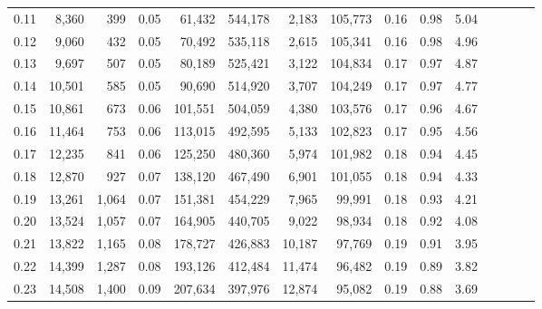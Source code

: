 \begin{tabular}{rrrcrrrrrrrrrrr}
0.11 &   8,360 &    399 &                                       0.05 &   61,432 &  544,178 &    2,183 &  105,773 &  0.16 &  0.98 &                         5.04 \\
0.12 &   9,060 &    432 &                                       0.05 &   70,492 &  535,118 &    2,615 &  105,341 &  0.16 &  0.98 &                         4.96 \\
0.13 &   9,697 &    507 &                                       0.05 &   80,189 &  525,421 &    3,122 &  104,834 &  0.17 &  0.97 &                         4.87 \\
0.14 &  10,501 &    585 &                                       0.05 &   90,690 &  514,920 &    3,707 &  104,249 &  0.17 &  0.97 &                         4.77 \\
0.15 &  10,861 &    673 &                                       0.06 &  101,551 &  504,059 &    4,380 &  103,576 &  0.17 &  0.96 &                         4.67 \\
0.16 &  11,464 &    753 &                                       0.06 &  113,015 &  492,595 &    5,133 &  102,823 &  0.17 &  0.95 &                         4.56 \\
0.17 &  12,235 &    841 &                                       0.06 &  125,250 &  480,360 &    5,974 &  101,982 &  0.18 &  0.94 &                         4.45 \\
0.18 &  12,870 &    927 &                                       0.07 &  138,120 &  467,490 &    6,901 &  101,055 &  0.18 &  0.94 &                         4.33 \\
0.19 &  13,261 &  1,064 &                                       0.07 &  151,381 &  454,229 &    7,965 &   99,991 &  0.18 &  0.93 &                         4.21 \\
0.20 &  13,524 &  1,057 &                                       0.07 &  164,905 &  440,705 &    9,022 &   98,934 &  0.18 &  0.92 &                         4.08 \\
0.21 &  13,822 &  1,165 &                                       0.08 &  178,727 &  426,883 &   10,187 &   97,769 &  0.19 &  0.91 &                         3.95 \\
0.22 &  14,399 &  1,287 &                                       0.08 &  193,126 &  412,484 &   11,474 &   96,482 &  0.19 &  0.89 &                         3.82 \\
0.23 &  14,508 &  1,400 &                                       0.09 &  207,634 &  397,976 &   12,874 &   95,082 &  0.19 &  0.88 &                         3.69 \\

\end{tabular}
